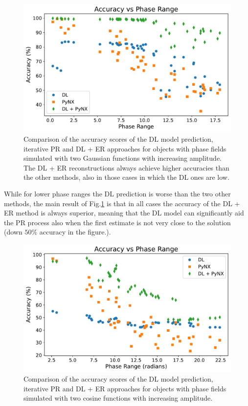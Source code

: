 \begin{figure}[H]
    \centering
    \includegraphics[width=\textwidth]{figures/Phasing/plot_acc_comparison_gaussfinal.pdf}
    \caption{Comparison of the accuracy scores of the DL model prediction, iterative PR and DL + ER approaches for objects with 
    phase fields simulated with two Gaussian functions with increasing amplitude. The DL + ER reconstructions always achieve 
    higher accuracies than the other methods, also in those cases in which the DL ones are low. }
    \label{fig:compare_gauss}
\end{figure}

While for lower phase ranges the DL prediction is worse than the two other methods, the main result of Fig.\ref{fig:compare_gauss} 
is that in all cases the accuracy of the DL + ER method is always superior, meaning that the DL model can significantly 
aid the PR process also when the first estimate is not very close to the solution (down $50\%$ accuracy in the figure.).

\begin{figure}[H]
    \centering
    \includegraphics[width=\textwidth]{figures/Phasing/plot_acc_comparison_cosine.pdf}
    \caption{Comparison of the accuracy scores of the DL model prediction, iterative PR and DL + ER approaches for objects with 
    phase fields simulated with two cosine functions with increasing amplitude. }
    \label{fig:compare_cosine}
\end{figure}

